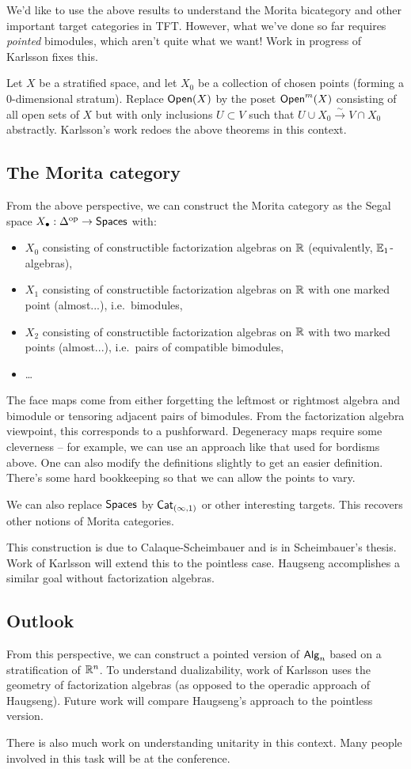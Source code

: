 We'd like to use the above results to understand the Morita bicategory and other important target categories in TFT.
However, what we've done so far requires \emph{pointed} bimodules, which aren't quite what we want!
Work in progress of Karlsson fixes this.

Let $X$ be a stratified space, and let $X_0$ be a collection of chosen points (forming a 0-dimensional stratum).
Replace $\mathsf{Open}(X)$ by the poset $\mathsf{Open}^m(X)$ consisting of all open sets of $X$ but with only inclusions $U \subset V$ such that $U \cup X_0 \xrightarrow{\sim} V \cap X_0$ abstractly.
Karlsson's work redoes the above theorems in this context.

\subsection{The Morita category}

From the above perspective, we can construct the Morita category as the Segal space $X_\bullet: \Delta^{\mathrm{op}} \to \mathsf{Spaces}$ with:
\begin{itemize}
	\item $X_0$ consisting of constructible factorization algebras on $\mathbb{R}$ (equivalently, $\mathbb{E}_1$-algebras),
	\item $X_1$ consisting of constructible factorization algebras on $\mathbb{R}$ with one marked point (almost...), i.e.\ bimodules,
	\item $X_2$ consisting of constructible factorization algebras on $\mathbb{R}$ with two marked points (almost...), i.e.\ pairs of compatible bimodules,
	\item \dots
\end{itemize}
The face maps come from either forgetting the leftmost or rightmost algebra and bimodule or tensoring adjacent pairs of bimodules.
From the factorization algebra viewpoint, this corresponds to a pushforward.
Degeneracy maps require some cleverness -- for example, we can use an approach like that used for bordisms above.
One can also modify the definitions slightly to get an easier definition.
There's some hard bookkeeping so that we can allow the points to vary.

We can also replace $\mathsf{Spaces}$ by $\mathsf{Cat}_{(\infty,1)}$ or other interesting targets.
This recovers other notions of Morita categories.

This construction is due to Calaque-Scheimbauer and is in Scheimbauer's thesis.
Work of Karlsson will extend this to the pointless case.
Haugseng accomplishes a similar goal without factorization algebras.

\subsection{Outlook}

From this perspective, we can construct a pointed version of $\mathsf{Alg}_n$ based on a stratification of $\mathbb{R}^n$.
To understand dualizability, work of Karlsson uses the geometry of factorization algebras (as opposed to the operadic approach of Haugseng).
Future work will compare Haugseng's approach to the pointless version.

There is also much work on understanding unitarity in this context.
Many people involved in this task will be at the conference.
